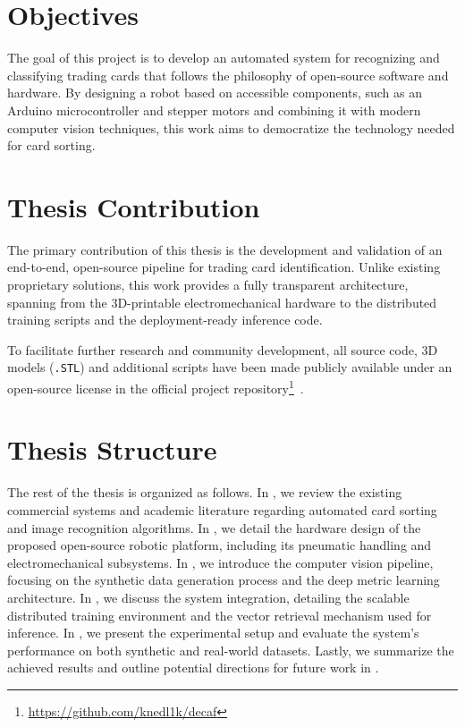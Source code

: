 \section{Objectives}
The goal of this project is to develop an automated system for recognizing and classifying trading cards that follows the philosophy of open-source software and hardware. By designing a robot based on accessible components, such as an Arduino microcontroller and stepper motors and combining it with modern computer vision techniques, this work aims to democratize the technology needed for card sorting.

\section{Thesis Contribution}
The primary contribution of this thesis is the development and validation of an end-to-end, open-source pipeline for trading card identification. Unlike existing proprietary solutions, this work provides a fully transparent architecture, spanning from the 3D-printable electromechanical hardware to the distributed training scripts and the deployment-ready inference code. 

To facilitate further research and community development, all source code, 3D models (\texttt{.STL}) and additional scripts have been made publicly available under an open-source license in the official project repository\footnote{\url{https://github.com/knedl1k/decaf}}~\cite{adamec2026decaf}.

\section{Thesis Structure}
The rest of the thesis is organized as follows. In , we review the existing commercial systems and academic literature regarding automated card sorting and image recognition algorithms. In , we detail the hardware design of the proposed open-source robotic platform, including its pneumatic handling and electromechanical subsystems. In , we introduce the computer vision pipeline, focusing on the synthetic data generation process and the deep metric learning architecture. In , we discuss the system integration, detailing the scalable distributed training environment and the vector retrieval mechanism used for inference. In , we present the experimental setup and evaluate the system's performance on both synthetic and real-world datasets. Lastly, we summarize the achieved results and outline potential directions for future work in .

